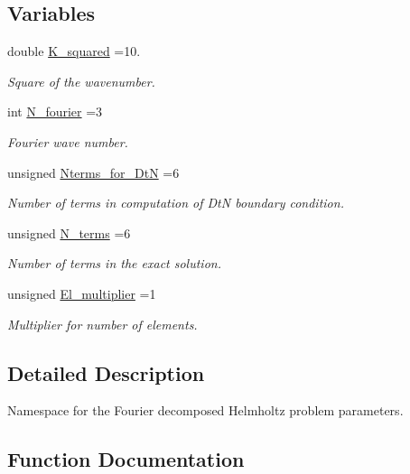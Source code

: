 \subsection*{Variables}
\begin{DoxyCompactItemize}
\item 
double \hyperlink{namespaceProblemParameters_aa5362de1af9e257fde4317c367158a93}{K\+\_\+squared} =10.
\begin{DoxyCompactList}\small\item\em Square of the wavenumber. \end{DoxyCompactList}\item 
int \hyperlink{namespaceProblemParameters_aaa674958a1ca6ee0b99de3377288c93f}{N\+\_\+fourier} =3
\begin{DoxyCompactList}\small\item\em Fourier wave number. \end{DoxyCompactList}\item 
unsigned \hyperlink{namespaceProblemParameters_aa529b33b7feb959e0c044447bf0f6c6f}{Nterms\+\_\+for\+\_\+\+DtN} =6
\begin{DoxyCompactList}\small\item\em Number of terms in computation of DtN boundary condition. \end{DoxyCompactList}\item 
unsigned \hyperlink{namespaceProblemParameters_a6361f0f1c4a120e62d28db64baa84b40}{N\+\_\+terms} =6
\begin{DoxyCompactList}\small\item\em Number of terms in the exact solution. \end{DoxyCompactList}\item 
unsigned \hyperlink{namespaceProblemParameters_a23b618b9e3a0d282fd91aa3f3f7b9254}{El\+\_\+multiplier} =1
\begin{DoxyCompactList}\small\item\em Multiplier for number of elements. \end{DoxyCompactList}\end{DoxyCompactItemize}


\subsection{Detailed Description}
Namespace for the Fourier decomposed Helmholtz problem parameters. 

\subsection{Function Documentation}
\mbox{\label{namespaceProblemParameters_acb1788444ef78fe2adec824504f24246}} 

